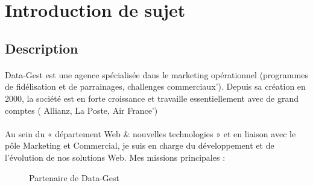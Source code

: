 \section{Introduction de sujet}
\justifying
\subsection{Description}
\paragraph{}
Data-Gest est une agence spécialisée dans le marketing opérationnel (programmes de fidélisation et de parrainages, challenges commerciaux'). Depuis sa création en 2000, la société est en forte croissance et travaille essentiellement avec de grand comptes ( Allianz, La Poste, Air France')
\paragraph{}


Au sein du « département Web \& nouvelles technologies » et en liaison avec le pôle Marketing et Commercial, je suis en charge du développement et de l'évolution de nos solutions Web. 
Mes missions principales :
\begin{figure}
  \centering
  \caption{Partenaire de Data-Gest}
  \label{fig:Partenaire de Data-Gest}
\end{figure}

